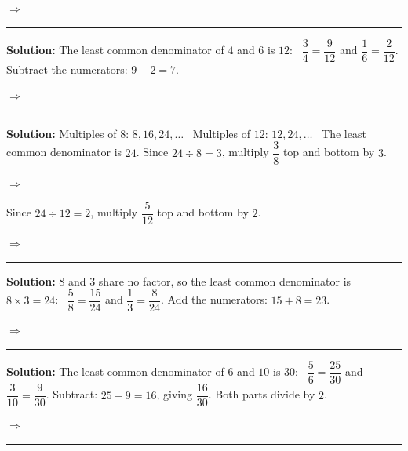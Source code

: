 \documentclass[12pt]{article}
\begin{document}
$\Rightarrow$ 

\vspace{0.15cm}\noindent\rule{\linewidth}{0.2pt}


\textbf{Solution:} The least common denominator of $4$ and $6$ is $12$: \ $\dfrac{3}{4} = \dfrac{9}{12}$ and $\dfrac{1}{6} = \dfrac{2}{12}$. Subtract the numerators: $9 - 2 = 7$.

$\Rightarrow$ 

\vspace{0.15cm}\noindent\rule{\linewidth}{0.2pt}


\textbf{Solution:} Multiples of $8$: $8, 16, 24, \ldots$ \ Multiples of $12$: $12, 24, \ldots$ \ The least common denominator is $24$. Since $24 \div 8 = 3$, multiply $\dfrac{3}{8}$ top and bottom by $3$.

$\Rightarrow$ 

Since $24 \div 12 = 2$, multiply $\dfrac{5}{12}$ top and bottom by $2$.

$\Rightarrow$ 

\vspace{0.15cm}\noindent\rule{\linewidth}{0.2pt}


\textbf{Solution:} $8$ and $3$ share no factor, so the least common denominator is $8 \times 3 = 24$: \ $\dfrac{5}{8} = \dfrac{15}{24}$ and $\dfrac{1}{3} = \dfrac{8}{24}$. Add the numerators: $15 + 8 = 23$.

$\Rightarrow$ 

\vspace{0.15cm}\noindent\rule{\linewidth}{0.2pt}


\textbf{Solution:} The least common denominator of $6$ and $10$ is $30$: \ $\dfrac{5}{6} = \dfrac{25}{30}$ and $\dfrac{3}{10} = \dfrac{9}{30}$. Subtract: $25 - 9 = 16$, giving $\dfrac{16}{30}$. Both parts divide by $2$.

$\Rightarrow$ 

\vspace{0.15cm}\noindent\rule{\linewidth}{0.2pt}
\end{document}
